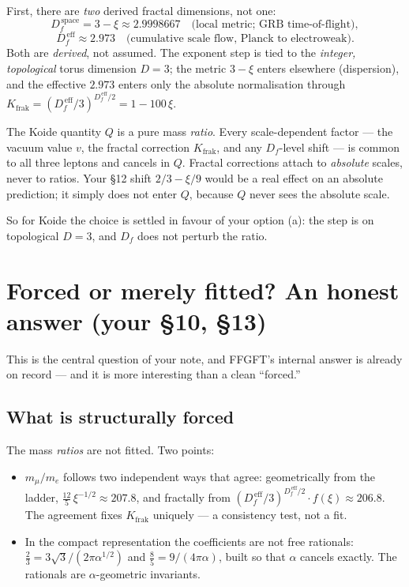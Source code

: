 First, there are \emph{two} derived fractal dimensions, not one:
\[
  D_f^{\,\text{space}} = 3 - \xi \approx 2.9998667
  \quad\text{(local metric; GRB time-of-flight)},
\]
\[
  D_f^{\,\text{eff}} \approx 2.973
  \quad\text{(cumulative scale flow, Planck to electroweak)}.
\]
Both are \emph{derived}, not assumed. The exponent step is tied to the
\emph{integer, topological} torus dimension $D=3$; the metric $3-\xi$ enters
elsewhere (dispersion), and the effective $2.973$ enters only the absolute
normalisation through $K_{\text{frak}} = (D_f^{\,\text{eff}}/3)^{D_f^{\,\text{eff}}/2}
= 1 - 100\,\xi$.

\begin{keyresult}
The Koide quantity $Q$ is a pure mass \emph{ratio}. Every scale-dependent
factor --- the vacuum value $v$, the fractal correction $K_{\text{frak}}$,
and any $D_f$-level shift --- is common to all three leptons and cancels in
$Q$. Fractal corrections attach to \emph{absolute} scales, never to ratios.
Your \S12 shift $2/3 - \xi/9$ would be a real effect on an absolute
prediction; it simply does not enter $Q$, because $Q$ never sees the
absolute scale.
\end{keyresult}

So for Koide the choice is settled in favour of your option (a): the step
is on topological $D=3$, and $D_f$ does not perturb the ratio.

\section{Forced or merely fitted? An honest answer (your \S10, \S13)}

This is the central question of your note, and FFGFT's internal answer is
already on record --- and it is more interesting than a clean ``forced.''

\subsection*{What is structurally forced}

The mass \emph{ratios} are not fitted. Two points:
\begin{itemize}
  \item $m_\mu/m_e$ follows two independent ways that agree:
        geometrically from the ladder, $\frac{12}{5}\,\xi^{-1/2} \approx 207.8$,
        and fractally from $(D_f^{\,\text{eff}}/3)^{D_f^{\,\text{eff}}/2}\!\cdot f(\xi)
        \approx 206.8$. The agreement fixes $K_{\text{frak}}$ uniquely --- a
        consistency test, not a fit.
  \item In the compact representation the coefficients are not free
        rationals: $\tfrac{2}{3} = 3\sqrt{3}/(2\pi\alpha^{1/2})$ and
        $\tfrac{8}{5} = 9/(4\pi\alpha)$, built so that $\alpha$ cancels
        exactly. The rationals are $\alpha$-geometric invariants.
\end{itemize}


